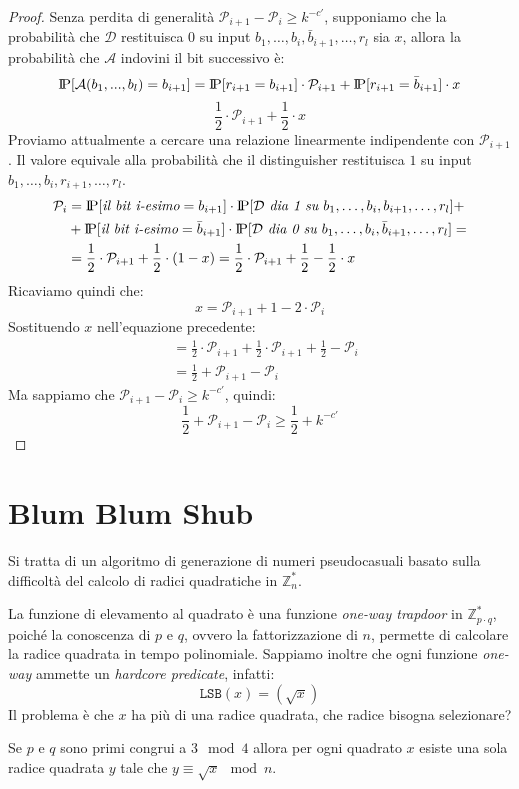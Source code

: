 \begin{proof}
  Senza perdita di generalità $\mathcal{P}_{i+1} - \mathcal{P}_i \geq k^{-c'}$,
  supponiamo che la probabilità che $\mathcal{D}$ restituisca $0$ su input $b_1, \dots, b_i, \bar{b}_{i+1}, \dots, r_l$ sia $x$,
  allora la probabilità che $\mathcal{A}$ indovini il bit successivo è:
  \[
    \text{I\kern-0.15em P}[\mathcal{A}(b_1,...,b_l) = b_{i+1}] = \text{I\kern-0.15em P}[r_{i+1} = b_{i+1}] \cdot \mathcal{P}_{i+1} + \text{I\kern-0.15em P}[r_{i+1} = \bar{b}_{i+1}] \cdot x
  \]
  \[
    \frac{1}{2}\cdot \mathcal{P}_{i+1} + \frac{1}{2}\cdot x
  \]
  Proviamo attualmente a cercare una relazione linearmente indipendente con $\mathcal{P}_{i+1}$. Il valore 
  equivale alla probabilità che il distinguisher restituisca $1$ su input $b_1, \dots, b_i, r_{i+1}, \dots, r_l$.
  \begin{align*}
    \mathcal{P}_i &= \text{I\kern-0.15em P}[\textit{il bit i-esimo} = b_{i+1}] \cdot \text{I\kern-0.15em P}[\mathcal{D} \textit{ dia 1 su } b_1, \dots, b_i, b_{i+1}, \dots, r_l] +\\
    &+ \text{I\kern-0.15em P}[\textit{il bit i-esimo} = \bar{b}_{i+1}] \cdot \text{I\kern-0.15em P}[\mathcal{D} \textit{ dia 0 su } b_1, \dots, b_i, \bar{b}_{i+1}, \dots, r_l] =\\
    &= \frac{1}{2} \cdot \mathcal{P}_{i+1} + \frac{1}{2} \cdot (1 - x) = \frac{1}{2} \cdot \mathcal{P}_{i+1} + \frac{1}{2} - \frac{1}{2} \cdot x
  \end{align*}
  Ricaviamo quindi che:
  \[
    x = \mathcal{P}_{i+1} + 1 - 2 \cdot \mathcal{P}_i
  \]
  Sostituendo $x$ nell'equazione precedente:
  \begin{align*}
    &= \frac{1}{2} \cdot \mathcal{P}_{i+1} + \frac{1}{2} \cdot \mathcal{P}_{i+1} + \frac{1}{2} - \mathcal{P}_i\\
    &= \frac{1}{2} + \mathcal{P}_{i+1} - \mathcal{P}_i  
  \end{align*}
  Ma sappiamo che $\mathcal{P}_{i+1} - \mathcal{P}_i \geq k^{-c'}$, quindi:
  \[
    \frac{1}{2} + \mathcal{P}_{i+1} - \mathcal{P}_i \geq \frac{1}{2} + k^{-c'}
  \]
\end{proof}
\section{Blum Blum Shub}
Si tratta di un algoritmo di generazione di numeri pseudocasuali 
basato sulla difficoltà del calcolo di radici quadratiche in $\mathbb{Z}_n^*$.

La funzione di elevamento al quadrato è una funzione \textit{one-way trapdoor} in $\mathbb{Z}_{p\cdot q}^*$,
poiché la conoscenza di $p$ e $q$, ovvero la fattorizzazione di $n$,
permette di calcolare la radice quadrata in tempo polinomiale.
Sappiamo inoltre che ogni funzione \textit{one-way} ammette un \textit{hardcore predicate}, infatti:
\[
  \texttt{LSB}(x) = (\sqrt{x})
\]
Il problema è che $x$ ha più di una radice quadrata, che radice bisogna selezionare?
\begin{theorem}
  Se $p$ e $q$ sono primi congrui a $3 \mod 4$ allora per ogni quadrato $x$ 
  esiste una sola radice quadrata $y$ tale che $y \equiv \sqrt{x} \mod n$.
\end{theorem}

